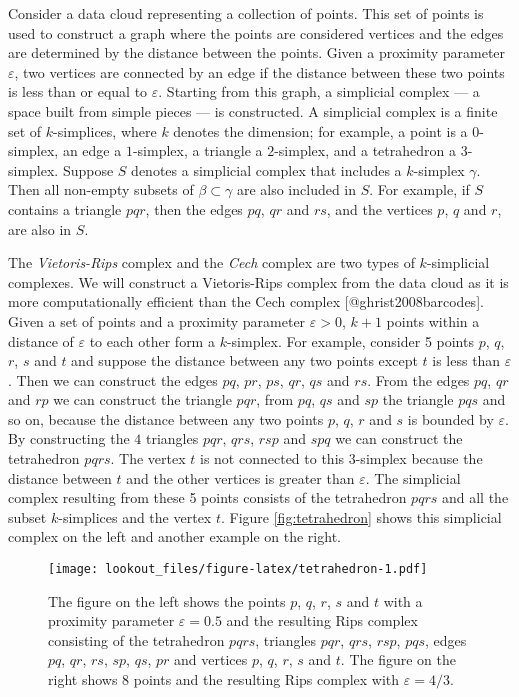 \documentclass[
]{article}
\begin{document}
Consider a data cloud representing a collection of points. This set of
points is used to construct a graph where the points are considered
vertices and the edges are determined by the distance between the
points. Given a proximity parameter \(\varepsilon\), two vertices are
connected by an edge if the distance between these two points is less
than or equal to \(\varepsilon\). Starting from this graph, a simplicial
complex --- a space built from simple pieces --- is constructed. A
simplicial complex is a finite set of \(k\)-simplices, where \(k\)
denotes the dimension; for example, a point is a \(0\)-simplex, an edge
a \(1\)-simplex, a triangle a \(2\)-simplex, and a tetrahedron a
\(3\)-simplex. Suppose \(S\) denotes a simplicial complex that includes
a \(k\)-simplex \(\gamma\). Then all non-empty subsets of
\(\beta \subset \gamma\) are also included in \(S\). For example, if
\(S\) contains a triangle \(pqr\), then the edges \(pq\), \(qr\) and
\(rs\), and the vertices \(p\), \(q\) and \(r\), are also in \(S\).

The \emph{Vietoris-Rips} complex and the \emph{Cech} complex are two
types of \(k\)-simplicial complexes. We will construct a Vietoris-Rips
complex from the data cloud as it is more computationally efficient than
the Cech complex {[}@ghrist2008barcodes{]}. Given a set of points and a
proximity parameter \(\varepsilon > 0\), \(k+1\) points within a
distance of \(\varepsilon\) to each other form a \(k\)-simplex. For
example, consider 5 points \(p\), \(q\), \(r\), \(s\) and \(t\) and
suppose the distance between any two points except \(t\) is less than
\(\varepsilon\). Then we can construct the edges \(pq\), \(pr\), \(ps\),
\(qr\), \(qs\) and \(rs\). From the edges \(pq\), \(qr\) and \(rp\) we
can construct the triangle \(pqr\), from \(pq\), \(qs\) and \(sp\) the
triangle \(pqs\) and so on, because the distance between any two points
\(p\), \(q\), \(r\) and \(s\) is bounded by \(\varepsilon\). By
constructing the \(4\) triangles \(pqr\), \(qrs\), \(rsp\) and \(spq\)
we can construct the tetrahedron \(pqrs\). The vertex \(t\) is not
connected to this \(3\)-simplex because the distance between \(t\) and
the other vertices is greater than \(\varepsilon\). The simplicial
complex resulting from these 5 points consists of the tetrahedron
\(pqrs\) and all the subset \(k\)-simplices and the vertex \(t\). Figure
\ref{fig:tetrahedron} shows this simplicial complex on the left and
another example on the right.

\begin{figure}
\centering
\texttt{[image: lookout\_files/figure-latex/tetrahedron-1.pdf]}
\caption{The figure on the left shows the points \(p\), \(q\), \(r\),
\(s\) and \(t\) with a proximity parameter \(\varepsilon = 0.5\) and the
resulting Rips complex consisting of the tetrahedron \(pqrs\), triangles
\(pqr\), \(qrs\), \(rsp\), \(pqs\), edges \(pq\), \(qr\), \(rs\),
\(sp\), \(qs\), \(pr\) and vertices \(p\), \(q\), \(r\), \(s\) and
\(t\). The figure on the right shows \(8\) points and the resulting Rips
complex with \(\varepsilon=4/3\).}
\end{figure}
\end{document}
